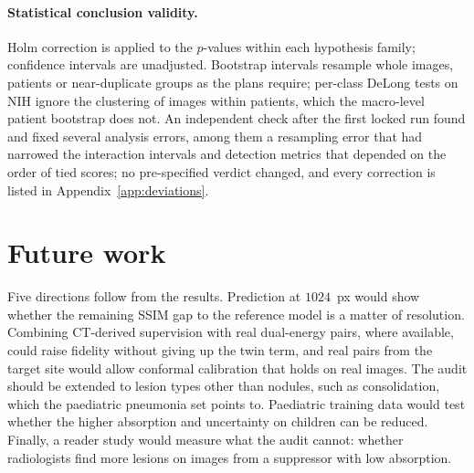 \paragraph{Statistical conclusion validity.} Holm correction is applied to the $p$-values within each hypothesis family; confidence intervals
are unadjusted. Bootstrap intervals resample whole images, patients or near-duplicate groups as the plans require; per-class DeLong tests on
NIH ignore the clustering of images within patients, which the macro-level patient bootstrap does not. An independent check after the first
locked run found and fixed several analysis errors, among them a resampling error that had narrowed the interaction intervals and detection
metrics that depended on the order of tied scores; no pre-specified verdict changed, and every correction is listed in
Appendix~\ref{app:deviations}.

\section{Future work}
Five directions follow from the results. Prediction at $1024$~px would show whether the remaining SSIM gap to the reference model is a matter of
resolution. Combining CT-derived supervision with real dual-energy pairs, where available, could raise fidelity without giving up the twin
term, and real pairs from the target site would allow conformal calibration that holds on real images. The audit should be extended to
lesion types other than nodules, such as consolidation, which the paediatric pneumonia set points to. Paediatric training data would test
whether the higher absorption and uncertainty on children can be reduced. Finally, a reader study would measure what the audit cannot:
whether radiologists find more lesions on images from a suppressor with low absorption.
